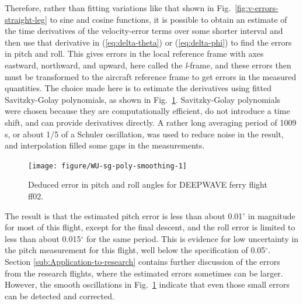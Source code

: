 \documentclass[12pt,twoside,english]{article}\usepackage[]{graphicx}\usepackage[]{color}
\newenvironment{knitrout}{}{} %
\let\OrgIndex\index
\renewcommand*{\index}[1]{\OrgIndex{#1}}
\begin{document}
Therefore, rather than fitting variations like that shown in Fig.~\ref{fig:v-errors-straight-leg} to sine and cosine functions, it is possible to obtain an estimate of the time derivatives of the velocity-error terms over some shorter interval and then use that derivative in (\ref{eq:delta-theta}) or (\ref{eq:delta-phi}) to find the errors in pitch and roll. This gives errors in the local reference frame with axes eastward, northward, and upward, here called the\emph{ l}-frame, and these errors then must be transformed to the aircraft reference frame to get errors in the measured quantities. The choice made here is to estimate the derivatives using fitted Savitzky-Golay polynomials, as shown in Fig.~\ref{fig:sg-poly-smoothing}. Savitzky-Golay polynomials were chosen because they are computationally efficient, do not introduce a time shift, and can provide derivatives directly. A rather long averaging period of 1009 s, or about 1/5 of a Schuler oscillation, was used to reduce noise in the result, and interpolation filled some gaps in the measurements. 

\begin{knitrout}\footnotesize
{}\color{fgcolor}\begin{figure}

{\centering \texttt{[image: figure/WU-sg-poly-smoothing-1]} 

}

\caption[Deduced error in pitch and roll angles for DEEPWAVE ferry flight ff02]{Deduced error in pitch and roll angles for DEEPWAVE ferry flight ff02.}\label{fig:sg-poly-smoothing}
\end{figure}


\end{knitrout}

The result is that the estimated pitch error is less than about 0.01$^{\circ}$ in magnitude for most of this flight, except for the final descent, and the roll error is limited to less than about 0.015$^{\circ}$ for the same period. This is evidence for low uncertainty in the pitch measurement for this flight, well below the specification of 0.05$^{\circ}$. Section \ref{sub:Application-to-research} contains further discussion of the errors from the research flights, where the estimated errors sometimes can be larger. However, the smooth oscillations in Fig.~\ref{fig:sg-poly-smoothing} indicate that even those small errors can be detected and corrected.
\end{document}
